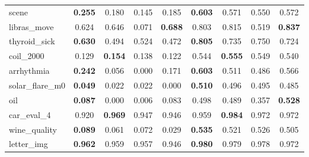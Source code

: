 \begin{figure}[ht]
\begin{tabular}{p{22mm}|*4{p{14mm}}|*4{p{14mm}}}
        scene&\multicolumn{1}{c}{\textbf{0.255}}&\multicolumn{1}{c}{0.180}&\multicolumn{1}{c}{0.145}&\multicolumn{1}{c|}{0.185}&\multicolumn{1}{c}{\textbf{0.603}}&\multicolumn{1}{c}{0.571}&\multicolumn{1}{c}{0.550}&\multicolumn{1}{c}{0.572}\\
        libras\_move&\multicolumn{1}{c}{0.624}&\multicolumn{1}{c}{0.646}&\multicolumn{1}{c}{0.071}&\multicolumn{1}{c|}{\textbf{0.688}}&\multicolumn{1}{c}{0.803}&\multicolumn{1}{c}{0.815}&\multicolumn{1}{c}{0.519}&\multicolumn{1}{c}{\textbf{0.837}}\\
        thyroid\_sick&\multicolumn{1}{c}{\textbf{0.630}}&\multicolumn{1}{c}{0.494}&\multicolumn{1}{c}{0.524}&\multicolumn{1}{c|}{0.472}&\multicolumn{1}{c}{\textbf{0.805}}&\multicolumn{1}{c}{0.735}&\multicolumn{1}{c}{0.750}&\multicolumn{1}{c}{0.724}\\
        coil\_2000&\multicolumn{1}{c}{0.129}&\multicolumn{1}{c}{\textbf{0.154}}&\multicolumn{1}{c}{0.138}&\multicolumn{1}{c|}{0.122}&\multicolumn{1}{c}{0.544}&\multicolumn{1}{c}{\textbf{0.555}}&\multicolumn{1}{c}{0.549}&\multicolumn{1}{c}{0.540}\\
        arrhythmia&\multicolumn{1}{c}{\textbf{0.242}}&\multicolumn{1}{c}{0.056}&\multicolumn{1}{c}{0.000}&\multicolumn{1}{c|}{0.171}&\multicolumn{1}{c}{\textbf{0.603}}&\multicolumn{1}{c}{0.511}&\multicolumn{1}{c}{0.486}&\multicolumn{1}{c}{0.566}\\
        solar\_flare\_m0&\multicolumn{1}{c}{\textbf{0.049}}&\multicolumn{1}{c}{0.022}&\multicolumn{1}{c}{0.022}&\multicolumn{1}{c|}{0.000}&\multicolumn{1}{c}{\textbf{0.510}}&\multicolumn{1}{c}{0.496}&\multicolumn{1}{c}{0.495}&\multicolumn{1}{c}{0.485}\\
        oil&\multicolumn{1}{c}{\textbf{0.087}}&\multicolumn{1}{c}{0.000}&\multicolumn{1}{c}{0.006}&\multicolumn{1}{c|}{0.083}&\multicolumn{1}{c}{0.498}&\multicolumn{1}{c}{0.489}&\multicolumn{1}{c}{0.357}&\multicolumn{1}{c}{\textbf{0.528}}\\
        car\_eval\_4&\multicolumn{1}{c}{0.920}&\multicolumn{1}{c}{\textbf{0.969}}&\multicolumn{1}{c}{0.947}&\multicolumn{1}{c|}{0.946}&\multicolumn{1}{c}{0.959}&\multicolumn{1}{c}{\textbf{0.984}}&\multicolumn{1}{c}{0.972}&\multicolumn{1}{c}{0.972}\\
        wine\_quality&\multicolumn{1}{c}{\textbf{0.089}}&\multicolumn{1}{c}{0.061}&\multicolumn{1}{c}{0.072}&\multicolumn{1}{c|}{0.029}&\multicolumn{1}{c}{\textbf{0.535}}&\multicolumn{1}{c}{0.521}&\multicolumn{1}{c}{0.526}&\multicolumn{1}{c}{0.505}\\
        letter\_img&\multicolumn{1}{c}{\textbf{0.962}}&\multicolumn{1}{c}{0.959}&\multicolumn{1}{c}{0.957}&\multicolumn{1}{c|}{0.946}&\multicolumn{1}{c}{\textbf{0.980}}&\multicolumn{1}{c}{0.979}&\multicolumn{1}{c}{0.978}&\multicolumn{1}{c}{0.972}\\

\end{tabular}
\end{figure}
